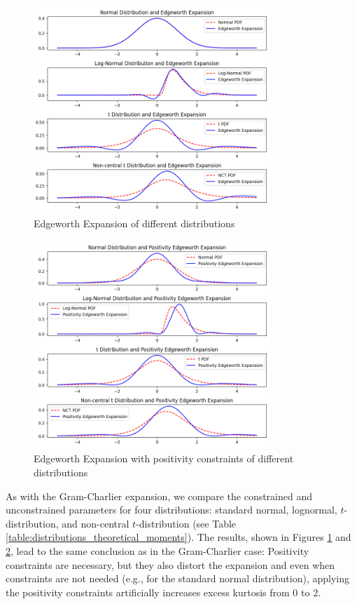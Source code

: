\begin{figure}[h]
    \centering
    \includegraphics[width=0.8\textwidth]{img/ew_expansion.png}
    \caption{Edgeworth Expansion of different distributions}
    \label{fig:ew_expansion}
\end{figure}

\begin{figure}[h]
    \centering
    \includegraphics[width=0.8\textwidth]{img/ew_positivity_expansion.png}
    \caption{Edgeworth Expansion with positivity constraints of different distributions}
    \label{fig:ew_positivity_expansion}
\end{figure}

As with the Gram-Charlier expansion, we compare the constrained and unconstrained parameters for four distributions: standard normal, lognormal, $t$-distribution, and non-central $t$-distribution (see Table \ref{table:distributions_theoretical_moments}). The results, shown in Figures \ref{fig:ew_expansion} and \ref{fig:ew_positivity_expansion}, lead to the same conclusion as in the Gram-Charlier case: Positivity constraints are necessary, but they also distort the expansion and even when constraints are not needed (e.g., for the standard normal distribution), applying the positivity constraints artificially increases excess kurtosis from 0 to 2.
